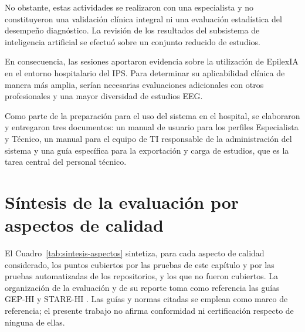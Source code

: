 No obstante, estas actividades se realizaron con una especialista y no constituyeron una validación clínica integral ni una evaluación estadística del desempeño diagnóstico. La revisión de los resultados del subsistema de inteligencia artificial se efectuó sobre un conjunto reducido de estudios.

En consecuencia, las sesiones aportaron evidencia sobre la utilización de EpilexIA en el entorno hospitalario del IPS. Para determinar su aplicabilidad clínica de manera más amplia, serían necesarias evaluaciones adicionales con otros profesionales y una mayor diversidad de estudios EEG.

Como parte de la preparación para el uso del sistema en el hospital, se elaboraron y entregaron tres documentos: un manual de usuario para los perfiles Especialista y Técnico, un manual para el equipo de TI responsable de la administración del sistema y una guía específica para la exportación y carga de estudios, que es la tarea central del personal técnico.

\section{Síntesis de la evaluación por aspectos de calidad}
\label{sec:sintesis-aspectos}

El Cuadro~\ref{tab:sintesis-aspectos} sintetiza, para cada aspecto de calidad considerado, los puntos cubiertos por las pruebas de este capítulo y por las pruebas automatizadas de los repositorios, y los que no fueron cubiertos.
La organización de la evaluación y de su reporte toma como referencia las guías GEP-HI \citep{Nykanen2011GEPHI} y STARE-HI \citep{Talmon2009STAREHI}.
Las guías y normas citadas se emplean como marco de referencia; el presente trabajo no afirma conformidad ni certificación respecto de ninguna de ellas.

